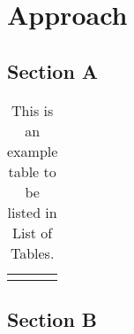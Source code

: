 
\chapter{Approach}
\label{ch:approach}

\section{Section A}
\label{sec:approach:section-a}

\begin{table}[h]
	\caption{This is an example table to be listed in List of Tables.}
	\label{tab:example}
	\centering
	\begin{tabular}{|c|c|}
		\hline 
		&  \\ 
		\hline 
		&  \\ 
		\hline 
	\end{tabular} 
\end{table}

\section{Section B}
\label{sec:approach:section-b}

